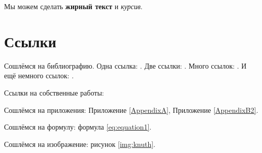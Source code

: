 


Мы можем сделать \textbf{жирный текст} и \textit{курсив}.


\section{Ссылки} \label{sect1_2}
Сошлёмся на библиографию.
Одна ссылка: \cite[с.~54]{Sokolov}\cite[с.~36]{Gaidaenko}.
Две ссылки: \cite{Sokolov,Gaidaenko}.
Много ссылок: %
\cite{Lermontov,Management,Borozda,Marketing,Constitution,FamilyCode,Gost.7.0.53,Razumovski,Lagkueva,Pokrovski,Sirotko,Lukina,Methodology,Encyclopedia,Nasirova,Berestova,Kriger}.
И ещё немного ссылок:
\cite{Article,Book,Booklet,Conference,Inbook,Incollection,Manual,Mastersthesis,Misc,Phdthesis,Proceedings,Techreport,Unpublished}.
\cite{medvedev2006jelektronnye, CEAT:CEAT581, doi:10.1080/01932691.2010.513279,Gosele1999161,Li2007StressAnalysis, Shoji199895,test:eisner-sample,AB_patent_Pomerantz_1968,iofis_patent1960}



Ссылки на собственные работы:~\cite{vakbib1, confbib1}

Сошлёмся на приложения: Приложение \ref{AppendixA}, Приложение \ref{AppendixB2}.

Сошлёмся на формулу: формула \eqref{eq:equation1}.

Сошлёмся на изображение: рисунок \ref{img:knuth}.


